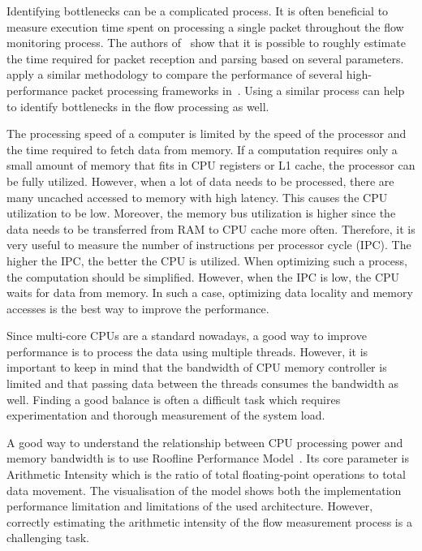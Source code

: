 Identifying bottlenecks can be a complicated process. It is often beneficial to measure execution time spent on processing a single packet throughout the flow monitoring process. The authors of~\cite{NETCOPETechnologies-2017-Modelling} show that it is possible to roughly estimate the time required for packet reception and parsing based on several parameters. \citeauthor{Gallenmueller-2015-Comparison} apply a similar methodology to compare the performance of several high-performance packet processing frameworks in~\cite{Gallenmueller-2015-Comparison}. Using a similar process can help to identify bottlenecks in the flow processing as well.

The processing speed of a computer is limited by the speed of the processor and the time required to fetch data from memory. If a computation requires only a small amount of memory that fits in CPU registers or L1 cache, the processor can be fully utilized. However, when a lot of data needs to be processed, there are many uncached accessed to memory with high latency. This causes the CPU utilization to be low. Moreover, the memory bus utilization is higher since the data needs to be transferred from RAM to CPU cache more often. Therefore, it is very useful to measure the number of instructions per processor cycle (IPC). The higher the IPC, the better the CPU is utilized. When optimizing such a process, the computation should be simplified. However, when the IPC is low, the CPU waits for data from memory. In such a case, optimizing data locality and memory accesses is the best way to improve the performance. 

Since multi-core CPUs are a standard nowadays, a good way to improve performance is to process the data using multiple threads. However, it is important to keep in mind that the bandwidth of CPU memory controller is limited and that passing data between the threads consumes the bandwidth as well. Finding a good balance is often a difficult task which requires experimentation and thorough measurement of the system load.

A good way to understand the relationship between CPU processing power and memory bandwidth is to use Roofline Performance Model~\cite{Williams-2009-Roofline}. Its core parameter is Arithmetic Intensity which is the ratio of total floating-point operations to total data movement. The visualisation of the model shows both the implementation performance limitation and limitations of the used architecture. However, correctly estimating the arithmetic intensity of the flow measurement process is a challenging task.

